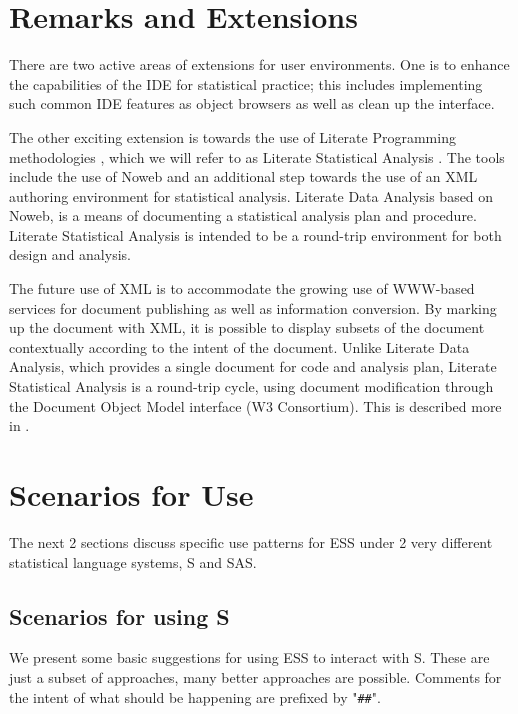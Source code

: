 \documentclass{article}
\begin{document}
\section{Remarks and Extensions}
\label{sec:remarks}

There are two active areas of extensions for user environments.  One
is to enhance the capabilities of the IDE for statistical practice;
this includes implementing such common IDE features as object browsers
as well as clean up the interface.

The other exciting extension is towards the use of Literate
Programming methodologies \citep{Knuth:1992,NRamsey:1994}, which we
will refer to as Literate Statistical Analysis \citep{ross:lunt:2001}.
The tools include the use of Noweb \citep{NRamsey:1994} and an
additional step towards the use of an XML authoring environment for
statistical analysis.  Literate Data Analysis based on Noweb, is a
means of documenting a statistical analysis plan and procedure.
Literate Statistical Analysis is intended to be a round-trip
environment for both design and analysis.

The future use of XML is to accommodate the growing use of WWW-based
services for document publishing as well as information conversion.
By marking up the document with XML, it is possible to display subsets
of the document contextually according to the intent of the document.
Unlike Literate Data Analysis, which provides a single document for
code and analysis plan, Literate Statistical Analysis is a round-trip
cycle, using document modification through the Document Object Model
interface (W3 Consortium).  This is described more in
\citep{ross:lunt:2001}. 



\appendix


\section{Scenarios for Use}
\label{app:Scenarios}

The next 2 sections discuss specific use patterns for ESS under 2 very
different statistical language systems, S and SAS.

\subsection{Scenarios for using S}
\label{sec:S:scenarios}

We present some basic suggestions for using ESS to interact with S.
These are just a subset of approaches, many better approaches are
possible. Comments for the intent of what should be happening are
prefixed by "\verb+##+".
\end{document}
